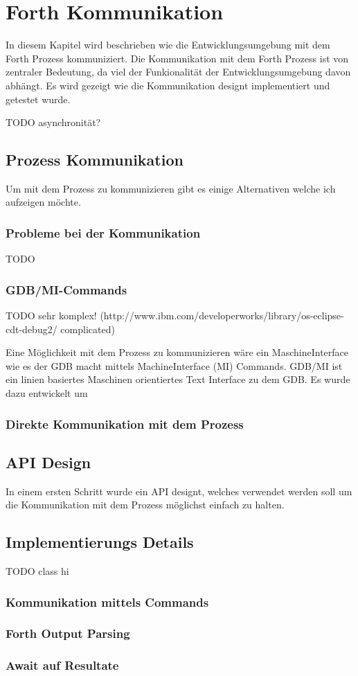 \chapter{Forth Kommunikation}
\label{forthcommunication}

In diesem Kapitel wird beschrieben wie die Entwicklungsumgebung mit dem Forth Prozess kommuniziert. Die Kommunikation mit dem Forth Prozess ist von zentraler Bedeutung, da viel der Funkionalität der Entwicklungsumgebung davon abhängt. Es wird gezeigt wie die Kommunikation designt implementiert und getestet wurde.

TODO asynchronität?


\section{Prozess Kommunikation}
Um mit dem Prozess zu kommunizieren gibt es einige Alternativen welche ich aufzeigen möchte.

\subsection{Probleme bei der Kommunikation}

TODO 

\subsection{GDB/MI-Commands}

TODO sehr komplex! (http://www.ibm.com/developerworks/library/os-eclipse-cdt-debug2/ complicated)

Eine Möglichkeit mit dem Prozess zu kommunizieren wäre ein MaschineInterface wie es der GDB macht mittels MachineInterface (MI)  Commands. GDB/MI ist ein linien basiertes Maschinen orientiertes Text Interface zu dem GDB. Es wurde dazu entwickelt um 

\subsection{Direkte Kommunikation mit dem Prozess}

\section{API Design}

In einem ersten Schritt wurde ein API designt, welches verwendet werden soll um die Kommunikation mit dem Prozess möglichst einfach zu halten.

\section{Implementierungs Details}

TODO class hi

\subsection{Kommunikation mittels Commands}

\subsection{Forth Output Parsing}

\subsection{Await auf Resultate}

